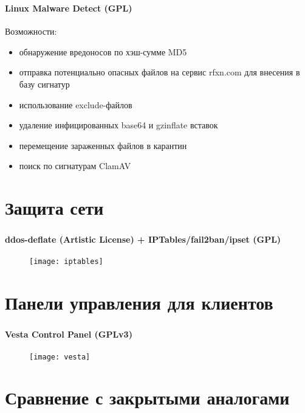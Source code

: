 \begin{frame}
\frametitle{\insertsection}
\framesubtitle{Linux Malware Detect (GPL)}
Возможности:
\begin{itemize}
	\item обнаружение вредоносов по хэш-сумме MD5
	\item отправка потенциально опасных файлов на сервис rfxn.com для внесения в базу сигнатур
	\item использование exclude-файлов
	\item удаление инфицированных base64 и gzinflate вставок
	\item перемещение зараженных файлов в карантин
	\item поиск по сигнатурам ClamAV
\end{itemize}
\end{frame}


\section{Защита сети}

\begin{frame}
\frametitle{\insertsection}
\framesubtitle{ddos-deflate (Artistic License) + IPTables/fail2ban/ipset (GPL)}
\begin{figure}[h]
	\center
	\texttt{[image: iptables]}
\end{figure}
\end{frame}


\section{Панели управления для клиентов}

\begin{frame}
\frametitle{\insertsection}
\framesubtitle{Vesta Control Panel (GPLv3)}
\begin{figure}[h]
	\center
	\texttt{[image: vesta]}
\end{figure}
\end{frame}


\section{Сравнение с закрытыми аналогами}


